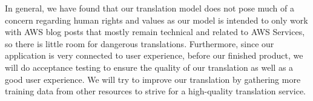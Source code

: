 In general, we have found that our translation model does not pose much of a concern regarding human rights and values as our model is intended to only work with AWS blog posts that mostly remain technical and related to AWS Services, so there is little room for dangerous translations. Furthermore, since our application is very connected to user experience, before our finished product, we will do acceptance testing to ensure the quality of our translation as well as a good user experience. We will try to improve our translation by gathering more training data from other resources to strive for a high-quality translation service.  
